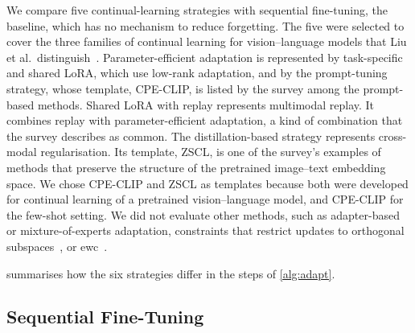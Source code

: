 We compare five continual-learning strategies with sequential fine-tuning, the baseline, which has no mechanism to reduce forgetting.
The five were selected to cover the three families of continual learning for vision--language models that Liu et al.\ distinguish~\cite[Sec.~4]{liu2026continuallearningvlmssurvey}.
Parameter-efficient adaptation is represented by task-specific and shared LoRA, which use low-rank adaptation, and by the prompt-tuning strategy, whose template, CPE-CLIP, is listed by the survey among the prompt-based methods.
Shared LoRA with replay represents multimodal replay.
It combines replay with parameter-efficient adaptation, a kind of combination that the survey describes as common.
The distillation-based strategy represents cross-modal regularisation.
Its template, ZSCL, is one of the survey's examples of methods that preserve the structure of the pretrained image--text embedding space.
We chose CPE-CLIP and ZSCL as templates because both were developed for continual learning of a pretrained vision--language model, and CPE-CLIP for the few-shot setting.
We did not evaluate other methods, such as adapter-based or mixture-of-experts adaptation, constraints that restrict updates to orthogonal subspaces~\cite[Sec.~4]{liu2026continuallearningvlmssurvey}, or \gls{ewc}~\cite{Kirkpatrick_2017}.

 summarises how the six strategies differ in the steps of \cref{alg:adapt}.

\begin{table}[tb]
\centering
\caption[Overview of the strategies]{Steps of \cref{alg:adapt} in which the six strategies differ. The column ``Added in training'' lists what a strategy adds to the training of sequential fine-tuning: extra training data ($\textsc{ExtraData}_{\mathcal{S}}$), an extra loss term ($\textsc{ExtraLoss}_{\mathcal{S}}$), or a gradient factor $\xi_{\mathcal{S},t} \neq 1$. The parentheses give the number of trained parameters.  gives the number of parameters that sequential fine-tuning and the distillation-based strategy can update.}
\label{tab:method-strategies}

\end{table}

\subsection{Sequential Fine-Tuning}
\label{subsec:method-seqft}

